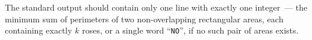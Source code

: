 The standard output should contain only one line with exactly one integer~--- the minimum sum of perimeters of two non-overlapping rectangular areas, each containing exactly $k$ roses, or a single word ``\texttt{NO}'', if no such pair of areas exists.